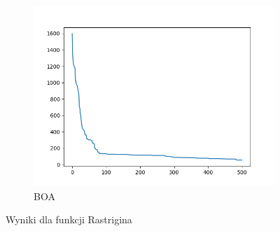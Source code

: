 \documentclass[12pt]{article}
\begin{document}
\begin{figure}[H]
\begin{subfigure}{0.32\textwidth}
        \includegraphics[width=\linewidth]{plots/BOA/rastrigin.png}
        \caption{BOA}
    \end{subfigure}
    \caption{Wyniki dla funkcji Rastrigina}
\end{figure}
\end{document}
